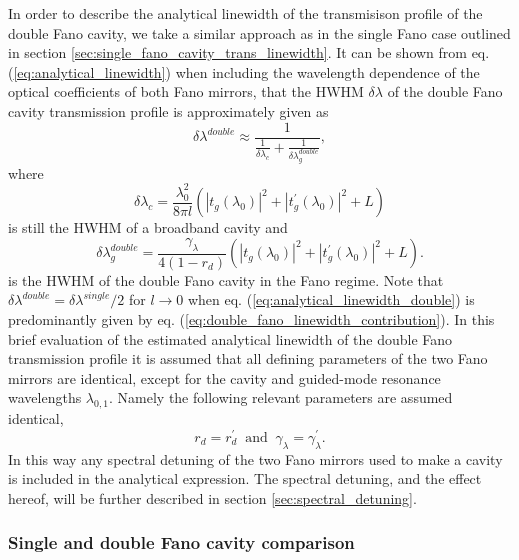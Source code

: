 In order to describe the analytical linewidth of the transmisison profile of the double Fano cavity, we take a similar approach as in the single Fano case outlined in section \ref{sec:single_fano_cavity_trans_linewidth}. It can be shown from eq. (\ref{eq:analytical_linewidth}) when including the wavelength dependence of the optical coefficients of both Fano mirrors, that the HWHM $\delta \lambda$ of the double Fano cavity transmission profile is approximately given as
\begin{equation}
    \delta \lambda^{double} \approx \frac{1}{\frac{1}{\delta \lambda_c} + \frac{1}{\delta \lambda_g^{double}}},
    \label{eq:analytical_linewidth_double}
\end{equation}
where 
\begin{equation}
    \delta \lambda_c = \frac{\lambda_0^2}{8 \pi l} (|t_g(\lambda_0)|^2 + |t_g^{\prime}(\lambda_0)|^2 + L)
\end{equation}
is still the HWHM of a broadband cavity and
\begin{equation}
    \delta \lambda_g^{double} = \frac{\gamma_{\lambda}}{4 (1-r_d)}(|t_g(\lambda_0)|^2 + |t_g^{\prime}(\lambda_0)|^2 + L).
    \label{eq:double_fano_linewidth_contribution}
\end{equation}
is the HWHM of the double Fano cavity in the Fano regime. Note that $\delta \lambda^{double} = \delta \lambda^{single}/2$ for $l \rightarrow 0$ when eq. (\ref{eq:analytical_linewidth_double}) is predominantly given by eq. (\ref{eq:double_fano_linewidth_contribution}). In this brief evaluation of the estimated analytical linewidth of the double Fano transmission profile it is assumed that all defining parameters of the two Fano mirrors are identical, except for the cavity and guided-mode resonance wavelengths $\lambda_{0,1}$. Namely the following relevant parameters are assumed identical,
\begin{equation}
    r_d = r_d^{\prime} \: \text{ and } \: \gamma_{\lambda} = \gamma_{\lambda}^{\prime}.
\end{equation}
In this way any spectral detuning of the two Fano mirrors used to make a cavity is included in the analytical expression. The spectral detuning, and the effect hereof, will be further described in section \ref{sec:spectral_detuning}.

\subsubsection{Single and double Fano cavity comparison}\label{sec:single_vs_double_comparison_theory}

